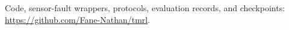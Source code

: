 Code, sensor-fault wrappers, protocols, evaluation records, and checkpoints: \url{https://github.com/Fane-Nathan/tmrl}.
